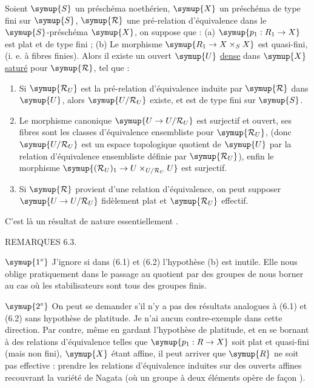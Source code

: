  Soient $\symup{S}$ un préschéma noethérien, $\symup{X}$ un
préschéma de type fini sur $\symup{S}$, $\symup{\mathcal R}$ une pré-relation d'équivalence dans le
$\symup{S}$-préschéma $\symup{X}$, on suppose que : (a) $\symup{p_1:R_1\to X}$ est plat et de type fini ; (b) Le morphisme $\symup{R_1\to X\times_S X}$ est quasi-fini, (i. e. à fibres
finies). Alors il existe un ouvert $\symup{U}$ \uline{dense} dans $\symup{X}$ \uline{saturé} pour $\symup{\mathcal R}$, tel que :
\begin{enumerate}
\item[(i)] Si $\symup{\mathcal R_U}$ est la pré-relation d'équivalence induite par $\symup{\mathcal R}$ dans
$\symup{U}$, alors $\symup{U/\mathcal R_U}$ existe, et est de type fini sur $\symup{S}$.

\item[(ii)] Le morphisme canonique $\symup{U\to U/\mathcal R_U}$ est surjectif et ouvert, ses
fibres sont les classes d'équivalence ensembliste pour $\symup{\mathcal R_U}$, (donc $\symup{U/\mathcal R_U}$ est
un espace topologique quotient de $\symup{U}$ par la relation d'équivalence ensembliste
définie par $\symup{\mathcal R_U}$), enfin le morphisme
$\symup{(\mathcal R_U)_1\to U\times_{U/\mathcal R_U}U}$ est surjectif.

\item[(iii)] Si $\symup{\mathcal R}$ provient d'une relation d'équivalence, on peut supposer
$\symup{U\to U/\mathcal R_U}$ fidèlement plat et $\symup{\mathcal R_U}$ effectif.
\end{enumerate}

C'est là un résultat de nature essentiellement .

\medskip
\noindent\textnormal{REMARQUES 6.3.}

\smallskip
\noindent $\symup{1^\circ}$ J'ignore si dans (6.1) et (6.2) l'hypothèse (b) est
inutile. Elle nous oblige pratiquement dans le passage au quotient par des
groupes de nous borner au cas où les stabilisateurs sont tous des groupes
finis.

\smallskip
\noindent $\symup{2^\circ}$ On peut se demander s'il n'y a pas des résultats analogues
à (6.1) et (6.2) sans hypothèse de platitude. Je n'ai aucun contre-exemple
dans cette direction. Par contre, même en gardant l'hypothèse de platitude, et
en se bornant à des relations d'équivalence telles que $\symup{p_1:R\to X}$ soit plat
et quasi-fini (mais non fini), $\symup{X}$ étant affine, il peut arriver que $\symup{R}$ ne
soit pas effective : prendre les relations d'équivalence induites sur des
ouverts affines recouvrant la variété de Nagata (où un groupe à deux éléments
opère de façon ).

